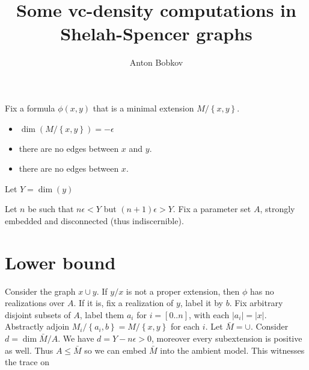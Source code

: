 \documentclass{amsart}
\newcommand{\curly}[1]{\left\{#1\right\}}
\newcommand{\paren}[1]{\left(#1\right)}
\begin{document}
\title{Some vc-density computations in Shelah-Spencer graphs}
\author{Anton Bobkov}

Fix a formula $\phi(x, y)$ that is a minimal extension $M/\curly{x,y}$. 
\begin{itemize}
	\item $\dim \paren{M/\curly{x,y}} = -\epsilon$
	\item there are no edges between $x$ and $y$.
	\item there are no edges between $x$.
\end{itemize}

Let $Y = \dim (y)$

Let $n$ be such that $n\epsilon < Y$ but $(n+1)\epsilon > Y$.
Fix a parameter set $A$, strongly embedded and disconnected (thus indiscernible).

\section{Lower bound}

Consider the graph $x \cup y$. If $y/x$ is not a proper extension, then $\phi$ has no realizations over $A$. If it is, fix a realization of $y$, label it by $b$. Fix arbitrary disjoint subsets of $A$, label them $a_i$ for $i=[0..n]$, with each $|a_i| = |x|$. Abstractly adjoin $M_i/\curly{a_i, b} = M/\curly{x,y}$ for each $i$. Let $\bar M = \cup$. Consider $d = \dim{\bar M / A}$. We have $d = Y - n \epsilon > 0$, moreover every subextension is positive as well. Thus $A \leq \bar M$ so we can embed $\bar M$ into the ambient model. This witnesses the trace on
\end{document}
